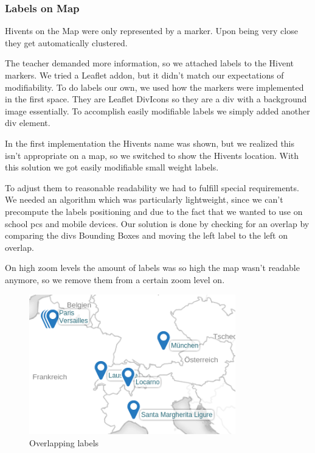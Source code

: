 \subsubsection{Labels on Map}
Hivents on the Map were only represented by a marker.
Upon being very close they get automatically clustered.

The teacher demanded more information, so we attached labels to the Hivent markers.
We tried a Leaflet addon, but it didn't match our expectations of modifiability.
To do labels our own, we used how the markers were implemented in the first space. They are Leaflet DivIcons so they are a div with a background image essentially. To accomplish easily modifiable labels we simply added another div element.

In the first implementation the Hivents name was shown, but we realized this isn't appropriate on a map, so we switched to show the Hivents location. With this solution we got easily modifiable small weight labels.

To adjust them to reasonable readability we had to fulfill special requirements.
We needed an algorithm which was  particularly lightweight, since we can't precompute the labels positioning and due to the fact that we wanted to use \HG on school pcs and mobile devices.
Our solution is done by checking for an overlap by comparing the divs Bounding Boxes and moving the left label to the left on overlap.

On high zoom levels the amount of labels was so high the map wasn't readable anymore, so we remove them from a certain zoom level on.

  \begin{figure}[H]
\begin{center}
  \includegraphics[width=0.8\textwidth]{graphics/overlapping_labels_2.png}
  \end{center}

  \caption{Overlapping labels}
  \label{fig:overlapping_labels}
  \end{figure}

